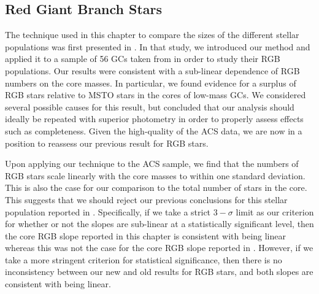\subsection{Red Giant Branch Stars} \label{RGBs4}

The technique used in this chapter to compare the sizes of
the different stellar populations was first presented in
\citet{leigh09}.  In that study, we introduced our method 
and applied it to a sample of 56 GCs taken from \citet{piotto02} in
order to study their RGB populations.  Our results 
were consistent with a sub-linear dependence of RGB numbers on the
core masses.  In particular, we found evidence for a surplus of RGB
stars relative to MSTO stars in the cores of low-mass GCs.  We
considered several possible causes for this result, 
but concluded that our analysis should ideally be repeated with
superior photometry in order to properly assess effects such as 
completeness.  Given the high-quality of the ACS data, we are now in
a position to reassess our previous result for RGB stars.

Upon applying our technique to the ACS sample, we find that the
numbers of RGB stars scale linearly with the core masses
to within one standard deviation.  This is also the case for our
comparison to the total number of stars in the core.  This 
suggests that we should reject our previous conclusions for this stellar
population reported in \citet{leigh09}.  Specifically, if we take a
strict $3-\sigma$ limit as our 
criterion for whether or not the slopes are sub-linear at a
statistically significant level, then the core RGB slope reported in
this chapter is consistent with being linear whereas this was not the case for
the core RGB slope reported in \citet{leigh09}.  However, if we take a
more stringent criterion for statistical significance,
then there is no inconsistency between our new and old results for RGB
stars, and both slopes are consistent with being linear.  

